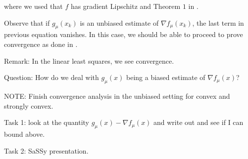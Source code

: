 \documentclass{article}
\begin{document}
where we used that $f$ has gradient Lipschitz and Theorem $1$ in \cite{Nesterov2015}. \newline 

Observe that if $g_{\mu}(x_k)$ is an unbiased estimate of $\nabla f_{\mu}(x_k)$, the last term in previous equation vanishes. In this case, we should be able to proceed to prove convergence as done in \cite{Nesterov2015}. \newline 

Remark: In the linear least squares, we see convergence. \newline 

Question: How do we deal with $g_{\mu}(x)$ being a biased estimate of $\nabla f_{\mu}(x)$? \newline 


NOTE: Finish convergence analysis in the unbiased setting for convex and strongly convex. \newline 

Task 1: look at the quantity $g_{\mu}(x) - \nabla f_{\mu}(x)$ and write out and see if I can bound above. \newline 

Task 2: SaSSy presentation. \newline 
\end{document}
